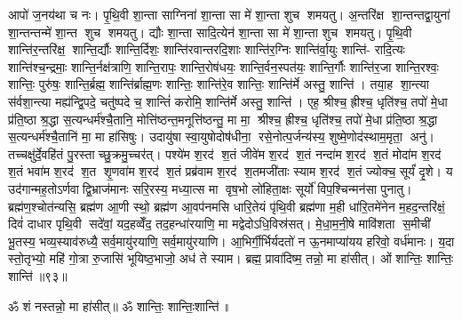 आपो॑ ज॒नय॑था च नः। पृ॒थि॒वी शा॒न्ता साग्निना॑ शा॒न्ता सा मे॑ शा॒न्ता शुच शमयतु। अ॒न्तरि॑क्ष शा॒न्तन्तद्वा॒युना॑ शा॒न्तन्तन्मे॑ शा॒न्त शुच शमयतु। द्यौः  शा॒न्ता सादि॒त्येन॑ शा॒न्ता सा मे॑ शा॒न्ता शुच शमयतु। पृ॒थि॒वी शान्ति॑र॒न्तरि॑क्ष॒ शान्ति॒र्द्यौः  शान्ति॒र्दिशः॒ शान्ति॑रवान्तरदि॒शाः  शान्ति॑र॒ग्निः  शान्ति॑र्वा॒युः  शान्ति॑- रादि॒त्यः  शान्ति॑श्च॒न्द्रमाः॒ शान्ति॒र्नक्ष॑त्राणि॒ शान्ति॒रापः॒ शान्ति॒रोष॑धयः॒ शान्ति॒र्वन॒स्पत॑यः॒ शान्ति॒र्गौः  शान्ति॑र॒जा शान्ति॒रश्वः॒ शान्तिः॒ पुरु॑षः॒ शान्ति॒र्ब्रह्म॒ शान्ति॑र्ब्राह्म॒णः  शान्तिः॒ शान्ति॑रे॒व शान्तिः॒ शान्ति॑र्मे अस्तु॒ शान्ति॑। तया॒ह शा॒न्त्या स॑र्वशा॒न्त्या मह्य॑न्द्वि॒पदे॒ चतु॑ष्पदे च॒ शान्तिं॑ करोमि॒ शान्ति॑र्मे अस्तु॒ शान्ति॑। एह॒ श्रीश्च॒ ह्रीश्च॒ धृति॑श्च॒ तपो॑ मे॒धा प्र॑ति॒ष्ठा श्र॒द्धा स॒त्यन्धर्म॑श्चै॒तानि॒ मोत्ति॑ष्ठन्त॒मनूत्ति॑ष्ठन्तु॒ मा मा॒ श्रीश्च॒ ह्रीश्च॒ धृति॑श्च॒ तपो॑ मे॒धा प्र॑ति॒ष्ठा श्र॒द्धा स॒त्यन्धर्म॑श्चै॒तानि॑ मा॒ मा हा॑सिषुः। उदायु॑षा स्वा॒युषोदोष॑धीना॒ रसे॒नोत्प॒र्जन्य॑स्य॒ शुष्मे॒णोद॑स्थाम॒मृता॒ अनु॑। तच्चक्षु॑र्दे॒वहि॑तं पु॒रस्ताच्छु॒क्रमु॒च्चर॑त्। पश्ये॑म श॒रद॑ श॒तं जीवे॑म श॒रद॑ श॒तं नन्दा॑म श॒रद॑ श॒तं मोदा॑म श॒रद॑ श॒तं भवा॑म श॒रद॑ श॒त शृ॒णवा॑म श॒रद॑ श॒तं प्रब्र॑वाम श॒रद॑ श॒तमजी॑ताः स्याम श॒रद॑ श॒तं ज्योक्च॒ सूर्यं॑ दृ॒शे। य उद॑गान्मह॒तोऽर्णवाद्वि॒भ्राज॑मानः सरि॒रस्य॒ मध्या॒त्स मा वृष॒भो लो॑हिता॒क्षः सूर्यो॑ विप॒श्चिन्मन॑सा पुनातु। ब्रह्म॑ण॒श्चोत॑न्यसि॒ ब्रह्म॑ण आ॒णी स्थो॒ ब्रह्म॑ण आ॒वप॑नमसि धारि॒तेयं पृ॑थि॒वी ब्रह्म॑णा म॒ही धा॑रि॒तमे॑नेन म॒हद॒न्तरि॑क्षं॒ दिवं॑ दाधार पृथि॒वी सदे॑वां॒ यद॒हव्वेँद॒ तद॒हन्धा॑रयाणि॒ मा मद्वेदोऽधि॒विस्र॑सत्। मे॒धा॒म॒नी॒षे मावि॑शता स॒मीची॑ भू॒तस्य॒ भव्य॒स्याव॑रुध्यै॒ सर्व॒मायु॑रयाणि॒ सर्व॒मायु॑रयाणि। आ॒भिर्गी॒र्भिर्यदतो॑ न ऊ॒नमाप्या॑यय हरिवो॒ वर्ध॑मानः। य॒दा स्तो॒तृभ्यो॒ महि॑ गो॒त्रा रु॒जासि॑ भूयिष्ठ॒भाजो॒ अध॑ ते स्याम। ब्रह्म॒ प्रावा॑दिष्म॒ तन्नो॒ मा हा॑सीत्। ओं शान्तिः॒ शान्तिः॒ शान्ति॑॥९३॥

\setcounter{anuvakam}{0}

ॐ शं नस्तन्नो॒ मा हा॑सीत्॥ ॐ शान्तिः॒ शान्तिः॒शान्ति॑॥

